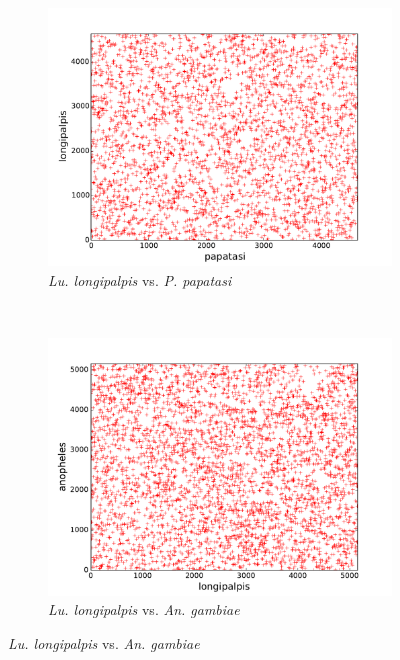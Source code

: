 \begin{figure}[H]
  \centering
  \caption{QUALITATIVE ANALYSIS OF MACROSYNTENY}
  \begin{subfigure}[b]{0.45\textwidth}
    \includegraphics[width=\textwidth]{figures/synteny/papatasi_longipalpis_plot}
    \caption{\emph{Lu. longipalpis} vs. \emph{P. papatasi}}
    \label{fig:synteny-dotplots-sandflies}
  \end{subfigure}
  \\
  \begin{subfigure}[b]{0.45\textwidth}
    \includegraphics[width=\textwidth]{figures/synteny/longipalpis_anopheles_plot}
    \caption{\emph{Lu. longipalpis} vs. \emph{An. gambiae}}
    \label{fig:synteny-dotplots-longipalpis-anopheles}

\end{subfigure}
\end{figure}
